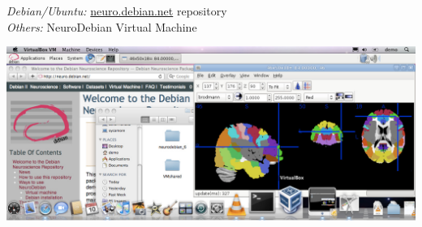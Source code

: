 \documentclass[letterpaper,landscape]{report}
\makeatletter
\newenvironment{ndtable}
  {\def\@captype{table}}
  {}
\newcommand{\ndheading}[3]{%
\vspace{0.5em}
\begin{ndtable}%
\rowcolors[\hline]{1}{#2}{} \arrayrulecolor{#3}
\begin{tabularx}{\columnwidth}{>{\centering\arraybackslash}X}\vspace{-.5em}\normalfont\large\bfseries
  #1\vspace{0.05em}\\\end{tabularx}
\end{ndtable}
\vspace{-.5em}
}
\newcommand{\ndsubsection}[1]{\ndheading{#1}{secbgcol}{secfgcol}}
\makeatother
\begin{document}
\begin{multicols}{3}
\textit{Debian/Ubuntu:} \url{neuro.debian.net} repository \\
\textit{Others:} NeuroDebian Virtual Machine

\vspace{3mm}
\includegraphics[width=\columnwidth]{../shots/mac_vm_mricron}

\def\blank{\hspace{0em}\vspace{-1em}}
\columnbreak


\end{multicols}
\end{document}
